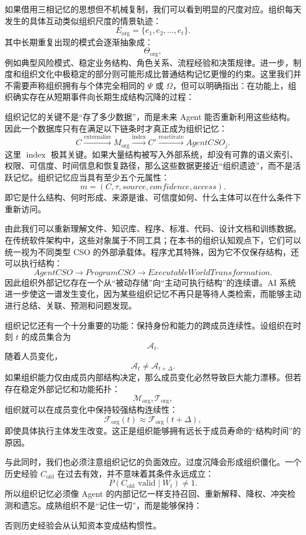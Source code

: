如果借用三相记忆的思想但不机械复制，我们可以看到明显的尺度对应。组织每天发生的具体互动类似组织尺度的情景轨迹：
\[
E_{\mathrm{org}}
=
\{e_1,e_2,\ldots,e_t\}.
\]
其中长期重复出现的模式会逐渐抽象成：
\[
\Theta_{\mathrm{org}},
\]
例如典型风险模式、稳定业务结构、角色关系、流程经验和决策规律。进一步，制度和组织文化中极稳定的部分则可能形成比普通结构记忆更慢的约束。这里我们并不需要声称组织拥有与个体完全相同的 $\Psi$ 或 $\Omega$，但可以明确指出：在功能上，组织确实存在从短期事件向长期生成结构沉降的过程：
\begin{statementbox}
\centering
{}
\end{statementbox}

组织记忆的关键不是“存了多少数据”，而是未来 Agent 能否重新利用这些结构。因此一个数据库只有在满足以下链条时才真正成为组织记忆：
\[
C
\xrightarrow{\operatorname{externalize}}
M_{\mathrm{org}}
\xrightarrow{\operatorname{index}}
C'
\xrightarrow{\operatorname{reactivate}}
AgentCSO_j.
\]
这里 $\operatorname{index}$ 极其关键。如果大量结构被写入外部系统，却没有可靠的语义索引、权限、可信度、时间信息和恢复路径，那么这些数据更接近“组织遗迹”，而不是活跃记忆。组织记忆应当具有至少五个元属性：
\[
m=
(C,\tau,source,confidence,access).
\]
即它是什么结构、何时形成、来源是谁、可信度如何、什么主体可以在什么条件下重新访问。

由此我们可以重新理解文件、知识库、程序、标准、代码、设计文档和训练数据。在传统软件架构中，这些对象属于不同工具；在本书的组织认知观点下，它们可以统一视为不同类型 CSO 的外部承载体。程序尤其特殊，因为它不仅保存结构，还可以执行结构：
\[
AgentCSO
\rightarrow
ProgramCSO
\rightarrow
ExecutableWorldTransformation.
\]
因此组织外部记忆存在一个从“被动存储”向“主动可执行结构”的连续谱。AI 系统进一步使这一谱发生变化，因为某些组织记忆不再只是等待人类检索，而能够主动进行总结、关联、预测和问题发现。

组织记忆还有一个十分重要的功能：保持身份和能力的跨成员连续性。设组织在时刻 $t$ 的成员集合为
\[
\mathcal A_t.
\]
随着人员变化，
\[
\mathcal A_t\neq\mathcal A_{t+\Delta}.
\]
如果组织能力仅由成员内部结构决定，那么成员变化必然导致巨大能力漂移。但若存在稳定外部记忆和功能拓扑：
\[
\mathcal M_{\mathrm{org}},
\mathcal T_{\mathrm{org}},
\]
组织就可以在成员变化中保持较强结构连续性：
\[
\mathcal F_{\mathrm{org}}(t)
\approx
\mathcal F_{\mathrm{org}}(t+\Delta),
\]
即使具体执行主体发生改变。这正是组织能够拥有远长于成员寿命的“结构时间”的原因。

与此同时，我们也必须注意组织记忆的负面效应。过度沉降会形成组织僵化。一个历史经验 $C_{\mathrm{old}}$ 在过去有效，并不意味着其条件永远成立：
\[
P(C_{\mathrm{old}}\text{ valid}\mid W_t)
\neq
1.
\]
所以组织记忆必须像 Agent 的内部记忆一样支持召回、重新解释、降权、冲突检测和遗忘。成熟组织不是“记住一切”，而是能够保持：
\begin{statementbox}
\centering
{}
\end{statementbox}
否则历史经验会从认知资本变成结构惯性。

